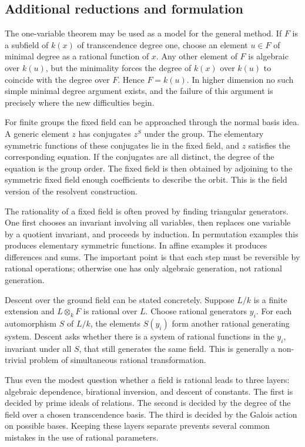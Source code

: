\documentclass[12pt]{article}
\begin{document}
\subsection{Additional reductions and formulation}

The one-variable theorem may be used as a model for the general method. If \(F\) is a subfield of
\(k(x)\) of transcendence degree one, choose an element \(u\in F\) of minimal degree as a rational
function of \(x\). Any other element of \(F\) is algebraic over \(k(u)\), but the minimality forces
the degree of \(k(x)\) over \(k(u)\) to coincide with the degree over \(F\). Hence \(F=k(u)\). In
higher dimension no such simple minimal degree argument exists, and the failure of this argument is
precisely where the new difficulties begin.

For finite groups the fixed field can be approached through the normal basis idea. A generic element
\(z\) has conjugates \(z^S\) under the group. The elementary symmetric functions of these conjugates
lie in the fixed field, and \(z\) satisfies the corresponding equation. If the conjugates are all
distinct, the degree of the equation is the group order. The fixed field is then obtained by
adjoining to the symmetric fixed field enough coefficients to describe the orbit. This is the field
version of the resolvent construction.

The rationality of a fixed field is often proved by finding triangular generators. One first chooses
an invariant involving all variables, then replaces one variable by a quotient invariant, and
proceeds by induction. In permutation examples this produces elementary symmetric functions. In
affine examples it produces differences and sums. The important point is that each step must be
reversible by rational operations; otherwise one has only algebraic generation, not rational
generation.

Descent over the ground field can be stated concretely. Suppose \(L/k\) is a finite extension and
\(L\otimes_k F\) is rational over \(L\). Choose rational generators \(y_i\). For each automorphism
\(S\) of \(L/k\), the elements \(S(y_i)\) form another rational generating system. Descent asks
whether there is a system of rational functions in the \(y_i\), invariant under all \(S\), that
still generates the same field. This is generally a non-trivial problem of simultaneous rational
transformation.

Thus even the modest question whether a field is rational leads to three layers: algebraic
dependence, birational inversion, and descent of constants. The first is decided by prime ideals of
relations. The second is decided by the degree of the field over a chosen transcendence basis. The
third is decided by the Galois action on possible bases. Keeping these layers separate prevents
several common mistakes in the use of rational parameters.
\end{document}
